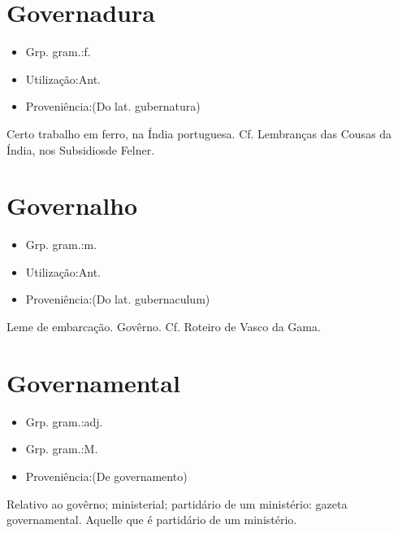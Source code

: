 \section{Governadura}
\begin{itemize}
\item {Grp. gram.:f.}
\end{itemize}
\begin{itemize}
\item {Utilização:Ant.}
\end{itemize}
\begin{itemize}
\item {Proveniência:(Do lat. \textunderscore gubernatura\textunderscore )}
\end{itemize}
Certo trabalho em ferro, na Índia portuguesa. Cf. \textunderscore Lembranças das Cousas da Índia\textunderscore , nos \textunderscore Subsidios\textunderscore  de Felner.
\section{Governalho}
\begin{itemize}
\item {Grp. gram.:m.}
\end{itemize}
\begin{itemize}
\item {Utilização:Ant.}
\end{itemize}
\begin{itemize}
\item {Proveniência:(Do lat. \textunderscore gubernaculum\textunderscore )}
\end{itemize}
Leme de embarcação.
Govêrno. Cf. \textunderscore Roteiro de Vasco da Gama\textunderscore .
\section{Governamental}
\begin{itemize}
\item {Grp. gram.:adj.}
\end{itemize}
\begin{itemize}
\item {Grp. gram.:M.}
\end{itemize}
\begin{itemize}
\item {Proveniência:(De \textunderscore governamento\textunderscore )}
\end{itemize}
Relativo ao govêrno; ministerial; partidário de um ministério: \textunderscore gazeta governamental\textunderscore .
Aquelle que é partidário de um ministério.
